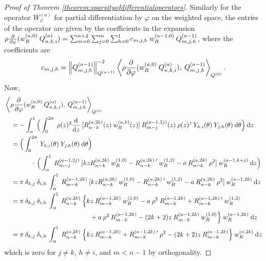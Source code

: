 \documentclass[11pt, oneside]{article}   	%
\begin{document}
\begin{proof}[Proof of Theorem \ref{theorem:sparsityofdifferentialoperators}]
Similarly for the operator $W_\varphi^{(a)}$ for partial differentiation by $\varphi$ on the weighted space, the entries of the operator are given by the coefficients in the expansion $\rho {\partial \over \partial \varphi} (w_R^{(a,0)} \: Q_{n,k,i}^{(a)}) = \sum_{m=0}^{n+2} \sum_{j=0}^m \sum_{h=0}^1 c_{m,j,h} \: w_R^{(a-1,0)} \: Q_{m,j,h}^{(a-1)}$, where the coefficients are
\begin{align*}
	c_{m,j,h} = \norm{\scopmjh^{(a-1)}}^{-2}_{\scop^{(a-1)}} \ip<\rhoppphi (\genjacw^{(a,0)} \: \scopnkia), \: \scopmjh^{(a-1)}>_{\scop^{(0)}}.
\end{align*}
Now,
\begin{align*}
	&\ip<\rhoppphi (\genjacw^{(a,0)} \: \scopnkia), \: \scopmjh^{(a-1)}>_{\scop^{(0)}} \\
	&\quad = - \int_\alpha^1 \Big( \int_0^{2\pi} \: \rho(z)^2 \ddz \: [\genjacnmk^{(a,2k)}(z) \: \genjacw^{(a, k)}(z)] \: \genjacmmj^{(a-1,2j)}(z) \: \rho(z)^j \: \chki(\theta) \: \chjh(\theta) \: \D \theta \Big) \: \D z \\
	&\quad = \Big( \int_0^{2\pi} \: \chki(\theta) \: \chjh(\theta) \: \D \theta \Big) \\
	&\quad \quad \quad \quad \cdot \: \Big( \int_\alpha^1 \: \genjacmmj^{(a-1,2j)} \: [k z \genjacnmk^{(a, 2k)} \: \genjacw^{(1, 0)} - \genjacnmk^{(a, 2k) \: \prime} \: \genjacw^{(1, 2)} - a \: \genjacnmk^{(a, 2k)} \: \rho^2] \: \genjacw^{(a-1, k + j)} \: \D z \Big) \\
	&\quad = \pi \: \delta_{k,j} \: \delta_{i,h} \:  \int_\alpha^1 \: \genjac_{m-k}^{(a-1,2k)} \: [k z \genjacnmk^{(a, 2k)} \: \genjacw^{(1, 0)} - \genjacnmk^{(a, 2k) \: \prime} \: \genjacw^{(1, 2)} - a \: \genjacnmk^{(a, 2k)} \: \rho^2] \: \genjacw^{(a-1, 2k)} \: \D z \\
	&\quad = \pi \: \delta_{k,j} \: \delta_{i,h} \: \int_\alpha^1 \: \genjacnmk^{(a, 2k)} \: \Big\{  k z \: \genjac_{m-k}^{(a-1,2k)} \: \genjacw^{(1, 0)} - a \: \rho^2 \: \genjac_{m-k}^{(a-1,2k)} + \genjac_{m-k}^{(a-1,2k) \: \prime} \: \genjacw^{(1, 2)} \\
	&\quad \quad \quad \quad \quad \quad \quad \quad \quad \quad \quad \quad \quad + a \: \rho^2 \: \genjac_{m-k}^{(a-1,2k)} - (2k+2) z \: \genjac_{m-k}^{(a-1,2k)} \: \genjacw^{(1, 0)} \Big\} \: \genjacw^{(a-1, 2k)} \: \D z \\
	&\quad = \pi \: \delta_{k,j} \: \delta_{i,h} \: \int_\alpha^1 \: \genjacnmk^{(a, 2k)} \: \Big\{  k z \: \genjac_{m-k}^{(a-1,2k)} + \genjac_{m-k}^{(a-1,2k) \: \prime} \: \rho^2- (2k+2) z \: \genjac_{m-k}^{(a-1,2k)} \Big\} \: \genjacw^{(a, 2k)} \: \D z
\end{align*}
which is zero for $j \ne k$, $h \ne i$, and $m < n - 1$ by orthogonality.


\end{proof}
\end{document}
